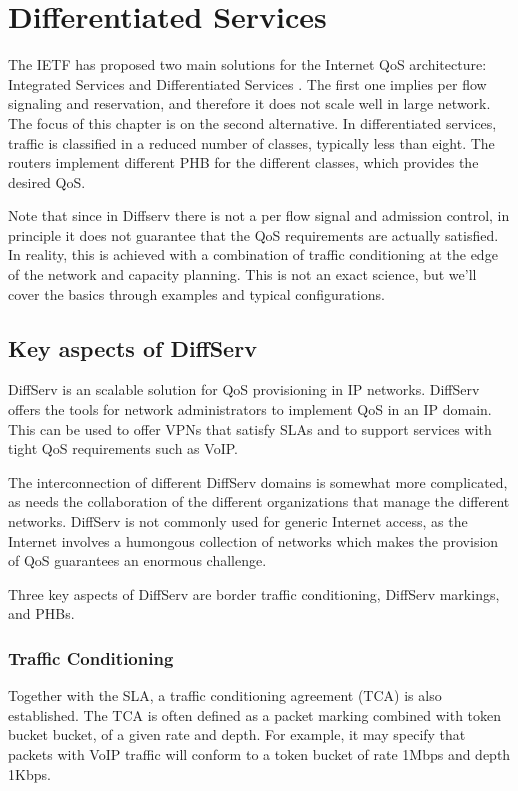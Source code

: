 \chapter{Differentiated Services}

The IETF has proposed two main solutions for the Internet QoS architecture: Integrated Services and Differentiated Services \cite{rfc2475}.
The first one implies per flow signaling and reservation, and therefore it does not scale well in large network.
The focus of this chapter is on the second alternative.
In differentiated services, traffic is classified in a reduced number of classes, typically less than eight.
The routers implement different PHB for the different classes, which provides the desired QoS.

Note that since in Diffserv there is not a per flow signal and admission control, in principle it does not guarantee that the QoS requirements are actually satisfied.
In reality, this is achieved with a combination of traffic conditioning at the edge of the network and capacity planning.
This is not an exact science, but we'll cover the basics through examples and typical configurations.

\section{Key aspects of DiffServ}
DiffServ is an scalable solution for QoS provisioning in IP networks.
DiffServ offers the tools for network administrators to implement QoS in an IP domain.
This can be used to offer VPNs that satisfy SLAs and to support services with tight QoS requirements such as VoIP.

The interconnection of different DiffServ domains is somewhat more complicated, as needs the collaboration of the different organizations that manage the different networks.
DiffServ is not commonly used for generic Internet access, as the Internet involves a humongous collection of networks which makes the provision of QoS guarantees an enormous challenge.

Three key aspects of DiffServ are border traffic conditioning, DiffServ markings, and PHBs.

\subsection{Traffic Conditioning}

Together with the SLA, a traffic conditioning agreement (TCA) is also established.
The TCA is often defined as a packet marking combined with token bucket bucket, of a given rate and depth.
For example, it may specify that packets with VoIP traffic will conform to a token bucket of rate 1Mbps and depth 1Kbps.

